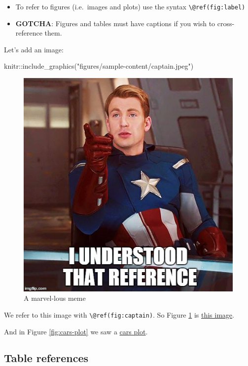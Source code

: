 \documentclass[a4paper, twoside]{templates/ociamthesis}
\providecommand{\tightlist}{%
  \setlength{\itemsep}{0pt}\setlength{\parskip}{0pt}}
\newenvironment{Shaded}{\begin{snugshade}}{\end{snugshade}}
\newcommand{\FunctionTok}[1]{\textcolor[rgb]{0.00,0.00,0.00}{#1}}
\newcommand{\NormalTok}[1]{#1}
\newcommand{\SpecialCharTok}[1]{\textcolor[rgb]{0.00,0.00,0.00}{#1}}
\newcommand{\StringTok}[1]{\textcolor[rgb]{0.31,0.60,0.02}{#1}}
\renewenvironment{Shaded}
{
  \vspace{10pt}%
  \begin{snugshade}%
}{%
  \end{snugshade}%
  \vspace{8pt}%
}
\begin{document}
\begin{itemize}
\tightlist
\item
  To refer to figures (i.e.~images and plots) use the syntax \texttt{\textbackslash{}@ref(fig:label)}
\item
  \textbf{GOTCHA}: Figures and tables must have captions if you wish to cross-reference them.
\end{itemize}

Let's add an image:

\begin{Shaded}
\begin{Highlighting}[]
\NormalTok{knitr}\SpecialCharTok{::}\FunctionTok{include\_graphics}\NormalTok{(}\StringTok{"figures/sample{-}content/captain.jpeg"}\NormalTok{)}
\end{Highlighting}
\end{Shaded}

\begin{figure}

{\centering \includegraphics[width=0.65\linewidth]{figures/sample-content/captain} 

}

\caption{A marvel-lous meme}\label{fig:captain}
\end{figure}

We refer to this image with \texttt{\textbackslash{}@ref(fig:captain)}.
So Figure \ref{fig:captain} is \protect\hyperlink{fig:captain}{this image}.

And in Figure \ref{fig:cars-plot} we saw a \protect\hyperlink{fig:cars-plot}{cars plot}.

\hypertarget{table-references}{%
\subsection{Table references}\label{table-references}}
\end{document}
